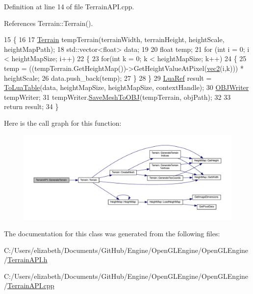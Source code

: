 Definition at line 14 of file Terrain\+A\+P\+I.\+cpp.



References Terrain\+::\+Terrain().


\begin{DoxyCode}
15 \{
16     
17   \hyperlink{class_terrain}{Terrain} tempTerrain(terrainWidth, terrainHeight, heightScale, heightMapPath);
18     std::vector<float> data;
19     
20   \textcolor{keywordtype}{float} temp;
21     \textcolor{keywordflow}{for} (\textcolor{keywordtype}{int} i = 0; i < heightMapSize; i++)
22     \{
23         \textcolor{keywordflow}{for}(\textcolor{keywordtype}{int} k = 0; k < heightMapSize; k++)
24         \{
25             temp = ((tempTerrain.GetHeightMap())->GetHeightValueAtPixel(\hyperlink{_types_8h_a43182e59794291f6ab00e51b160706c2}{vec2}(i,k))) * heightScale;
26             data.push\_back(temp);
27         \}
28     \}
29     \hyperlink{_lua_context_8h_a2220f03700ba40e366f0ee2d684d5c91}{LuaRef} result = \hyperlink{_math_a_p_i_8h_a6d4bdd6987400be64a6a029dbf3e5fb2}{ToLuaTable}(data, heightMapSize, heightMapSize, contextHandle);
30     \hyperlink{class_o_b_j_writer}{OBJWriter} tempWriter;
31     tempWriter.\hyperlink{class_o_b_j_writer_a99cb9b1c28fa4c59c8087a9c1c6899e3}{SaveMeshToOBJ}(tempTerrain, objPath);
32 
33     \textcolor{keywordflow}{return} result;
34 \}
\end{DoxyCode}


Here is the call graph for this function\+:
\nopagebreak
\begin{figure}[H]
\begin{center}
\leavevmode
\includegraphics[width=350pt]{class_terrain_a_p_i_a77f6f3df5ae85964a74eed00b76e1154_cgraph}
\end{center}
\end{figure}




The documentation for this class was generated from the following files\+:\begin{DoxyCompactItemize}
\item 
C\+:/\+Users/elizabeth/\+Documents/\+Git\+Hub/\+Engine/\+Open\+G\+L\+Engine/\+Open\+G\+L\+Engine/\hyperlink{_terrain_a_p_i_8h}{Terrain\+A\+P\+I.\+h}\item 
C\+:/\+Users/elizabeth/\+Documents/\+Git\+Hub/\+Engine/\+Open\+G\+L\+Engine/\+Open\+G\+L\+Engine/\hyperlink{_terrain_a_p_i_8cpp}{Terrain\+A\+P\+I.\+cpp}\end{DoxyCompactItemize}
